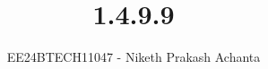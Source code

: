 \documentclass[journal]{IEEEtran}
\begin{document}

\vspace{3cm}

\title{1.4.9.9}
\author{EE24BTECH11047 - Niketh Prakash Achanta
}
{\let\newpage\relax\maketitle}

\renewcommand{\thefigure}{\theenumi}
\renewcommand{\thetable}{\theenumi}
\setlength{\intextsep}{10pt} %


\renewcommand{\thetable}{\theenumi}
\end{document}
